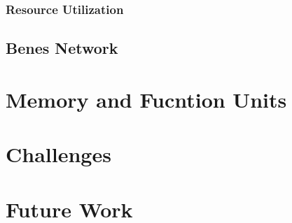 \documentclass{beamer}
\begin{document}
	\subsubsection{Resource Utilization}
	  
      
  \subsection{Benes Network}
		

\section{Memory and Fucntion Units}
  
  
\section{Challenges}
  
  
\section{Future Work}
  
  
\end{document}
